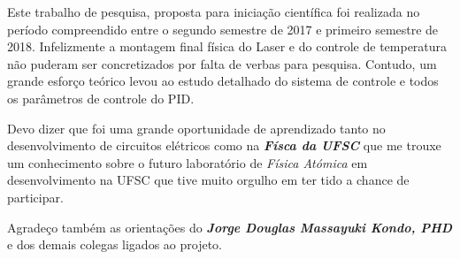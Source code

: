 Este trabalho de pesquisa, proposta para iniciação científica foi realizada no período compreendido entre o segundo semestre de 2017 e primeiro semestre de 2018. Infelizmente a montagem final física do Laser e do controle de temperatura não puderam ser concretizados por falta de verbas para pesquisa. Contudo, um grande esforço teórico levou ao estudo detalhado do sistema de controle e todos os parâmetros de controle do PID. 

Devo dizer que foi uma grande oportunidade de aprendizado tanto no desenvolvimento de circuitos elétricos como na \textbf{\emph{Físca da UFSC}} que me trouxe um conhecimento sobre o futuro laboratório de \emph{Física Atómica} em desenvolvimento na UFSC que tive muito orgulho em ter tido a chance de participar. 

Agradeço também as orientações do \textbf{\emph{Jorge Douglas Massayuki Kondo, PHD}} e dos demais colegas ligados ao projeto. 

